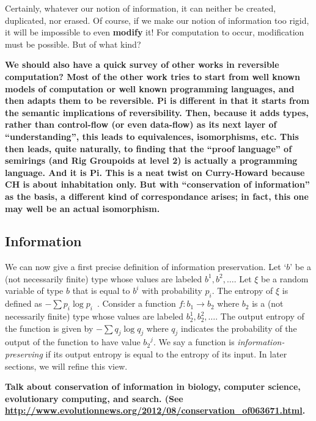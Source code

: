 \documentclass{article}
\newcommand{\amr}[1]{\fbox{Amr says:} \textbf{#1}}
\begin{document}
Certainly, whatever our notion of information, it can neither be created,
duplicated, nor erased. Of course, if we make our notion of information
too rigid, it will be impossible to even \textbf{modify} it! For computation
to occur, modification must be possible.  But of what kind?

\amr{We should also have a quick survey of other works in reversible
computation? Most of the other work tries to start from well known
models of computation or well known programming languages, and then
adapts them to be reversible. Pi is different in that it starts from
the semantic implications of reversibility. Then, because it adds
types, rather than control-flow (or even data-flow) as its next layer
of ``understanding'', this leads to equivalences, isomorphisms, etc.
This then leads, quite naturally, to finding that the ``proof
language'' of semirings (and Rig Groupoids at level 2) is actually a
programming language. And it is Pi. This is a neat twist on
Curry-Howard because CH is about \textbf{inhabitation} only. But with
``conservation of information'' as the basis, a different kind of
correspondance arises; in fact, this one may well be an actual
isomorphism.}

\subsection{Information}

We can now give a first precise definition of information preservation.
Let
`$b$' be a (not necessarily finite) type whose values are labeled
$b^1, b^2, \ldots$. Let $\xi$ be a random variable of type $b$ that is
equal to $b^i$ with probability $p_i$. The entropy of $\xi$ is defined
as $-\sum p_i \log{p_i}$~\cite{Shannon1948}.  Consider a function
$f : b_1 \rightarrow b_2$ where $b_2$ is a (not necessarily finite)
type whose values are labeled $b_2^1, b_2^2, \ldots$. The output
entropy of the function is given by $- \sum q_j \log{q_j}$ where $q_j$
indicates the probability of the output of the function to have value
${b_2}^j$. We say a function is \emph{information-preserving} if its
output entropy is equal to the entropy of its input. In later sections,
we will refine this view.

\amr{
Talk about conservation of information in biology, computer science,
evolutionary computing, and search. (See
\url{http://www.evolutionnews.org/2012/08/conservation_of063671.html}.
}

\end{document}

